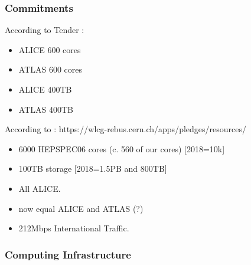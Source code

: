 \documentclass{beamer}
\begin{document}
\begin{frame}
\frametitle{Commitments}
According to Tender :
\begin{itemize}
  \item ALICE 600 cores
  \item ATLAS 600 cores
  \item ALICE 400TB
  \item ATLAS 400TB
\end{itemize}
According to :
https://wlcg-rebus.cern.ch/apps/pledges/resources/
\begin{itemize}
    \item 6000 HEPSPEC06 cores (c. 560 of our cores) [2018=10k]
    \item 100TB storage [2018=1.5PB and 800TB]
  \item All ALICE.
  \item now equal ALICE and ATLAS (?)
  \item 212Mbps International Traffic.
\end{itemize}
\end{frame}

\begin{frame}
  \frametitle{Computing Infrastructure}
\end{frame}
\end{document}

